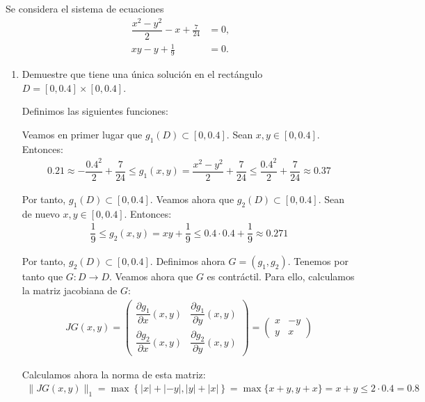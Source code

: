\begin{ejercicio}\label{ej:1.1.17}
    Se considera el sistema de ecuaciones
    \begin{align*}
        \dfrac{x^2-y^2}{2}-x + \frac{7}{24} &= 0, \\
        xy - y + \frac{1}{9} &= 0.
    \end{align*}
    \begin{enumerate}
        \item Demuestre que tiene una única solución en el rectángulo $D = [0, 0.4] \times [0, 0.4]$.
        
        Definimos las siguientes funciones:

        Veamos en primer lugar que $g_1(D)\subset [0,0.4]$. Sean $x,y\in [0,0.4]$. Entonces:
        \begin{align*}
            0.21\approx -\dfrac{0.4^2}{2}+\dfrac{7}{24}\leq g_1(x,y)=\dfrac{x^2-y^2}{2}+\dfrac{7}{24}\leq \dfrac{0.4^2}{2}+\dfrac{7}{24}\approx 0.37
        \end{align*}

        Por tanto, $g_1(D)\subset [0,0.4]$. Veamos ahora que $g_2(D)\subset [0,0.4]$. Sean de nuevo $x,y\in [0,0.4]$. Entonces:
        \begin{align*}
            \dfrac{1}{9}\leq g_2(x,y)=xy+\dfrac{1}{9}\leq 0.4\cdot 0.4+\dfrac{1}{9}\approx 0.271
        \end{align*}

        Por tanto, $g_2(D)\subset [0,0.4]$. Definimos ahora $G=(g_1,g_2)$. Tenemos por tanto que $G:D\to D$. Veamos ahora que $G$ es contráctil. Para ello, calculamos la matriz jacobiana de $G$:
        \begin{align*}
            JG(x,y)=\begin{pmatrix}
                \dfrac{\partial g_1}{\partial x}(x,y) & \dfrac{\partial g_1}{\partial y}(x,y)\\
                \dfrac{\partial g_2}{\partial x}(x,y) & \dfrac{\partial g_2}{\partial y}(x,y)
            \end{pmatrix}=\begin{pmatrix}
                x & -y\\
                y & x
            \end{pmatrix}
        \end{align*}

        Calculamos ahora la norma de esta matriz:
        \begin{align*}
            \|JG(x,y)\|_1=\max\left\{|x|+|-y|,|y|+|x|\right\}=\max\{x+y,y+x\}=x+y\leq 2\cdot 0.4=0.8
        \end{align*}


\end{enumerate}
\end{ejercicio}
